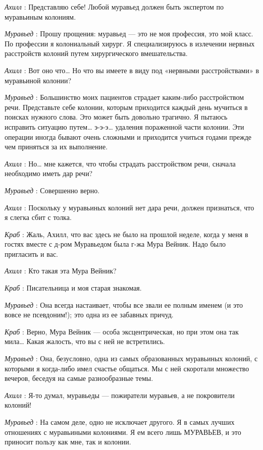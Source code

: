 \documentclass[../main.tex]{subfiles}
\begin{document}
\begin{dialogue}
\emph{Ахилл} : Представляю себе! Любой муравьед должен быть экспертом по муравьиным колониям.

\emph{Муравьед} : Прошу прощения: муравьед --- это не моя профессия, это мой класс. По профессии я колониальный хирург. Я специализируюсь в излечении нервных расстройств колоний путем хирургического вмешательства.

\emph{Ахилл} : Вот оно что\ldots{} Но что вы имеете в виду под «нервными расстройствами» в муравьиной колонии?

\emph{Муравьед} : Большинство моих пациентов страдает каким-либо расстройством речи. Представьте себе колонии, которым приходится каждый день мучиться в поисках нужного слова. Это может быть довольно трагично. Я пытаюсь исправить ситуацию путем\ldots{} э-э-э\ldots{} удаления пораженной части колонии. Эти операции иногда бывают очень сложными и приходится учиться годами прежде чем приняться за их выполнение.

\emph{Ахилл} : Но\ldots{} мне кажется, что чтобы страдать расстройством речи, сначала необходимо иметь дар речи?

\emph{Муравьед} : Совершенно верно.

\emph{Ахилл} : Поскольку у муравьиных колоний нет дара речи, должен признаться, что я слегка сбит с толка.

\emph{Краб} : Жаль, Ахилл, что вас здесь не было на прошлой неделе, когда у меня в гостях вместе с д-ром Муравьедом была г-жа Мура Вейник. Надо было пригласить и вас.

\emph{Ахилл} : Кто такая эта Мура Вейник?

\emph{Краб} : Писательница и моя старая знакомая.

\emph{Муравьед} : Она всегда настаивает, чтобы все звали ее полным именем (и это вовсе не псевдоним!); это одна из ее забавных причуд.

\emph{Краб} : Верно, Мура Вейник --- особа эксцентрическая, но при этом она так мила\ldots{} Какая жалость, что вы с ней не встретились.

\emph{Муравьед} : Она, безусловно, одна из самых образованных муравьиных колоний, с которыми я когда-либо имел счастье общаться. Мы с ней скоротали множество вечеров, беседуя на самые разнообразные темы.

\emph{Ахилл} : Я-то думал, муравьеды --- пожиратели муравьев, а не покровители колоний!

\emph{Муравьед} : На самом деле, одно не исключает другого. Я в самых лучших отношениях с муравьиными колониями. Я ем всего лишь МУРАВЬЕВ, и это приносит пользу как мне, так и колонии.


\end{dialogue}
\end{document}
